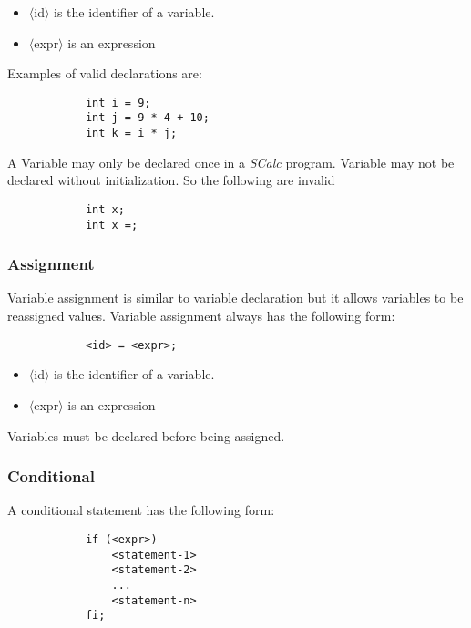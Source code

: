 \documentclass{article}
\begin{document}
		\begin{itemize}
			\item{$\langle$id$\rangle$} is the identifier of a variable.
			\item{$\langle$expr$\rangle$} is an expression
		\end{itemize}

		Examples of valid declarations are:

		\begin{lstlisting}
			int i = 9;
			int j = 9 * 4 + 10;
			int k = i * j;
		\end{lstlisting}

		A Variable may only be declared once in a \textit{SCalc} program. Variable may not be declared without
		initialization. So the following are invalid

		\begin{lstlisting}
			int x;
			int x =;
		\end{lstlisting}


	\subsubsection{Assignment}

		Variable assignment is similar to variable declaration but it allows variables to be reassigned values. Variable
		assignment always has the following form:

		\begin{lstlisting}
			<id> = <expr>;
		\end{lstlisting}

		\begin{itemize}
			\item{$\langle$id$\rangle$} is the identifier of a variable.
			\item{$\langle$expr$\rangle$} is an expression
		\end{itemize}

		Variables must be declared before being assigned.


	\subsubsection{Conditional}

		A conditional statement has the following form:

		\begin{lstlisting}
			if (<expr>)
				<statement-1>
				<statement-2>
				...
				<statement-n>
			fi;
		\end{lstlisting}
\end{document}
